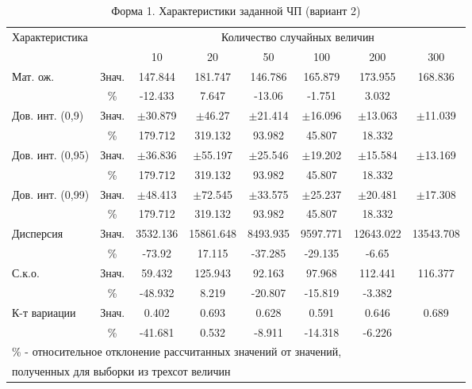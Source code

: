 \documentclass{article}
\begin{document}
\begin{table}[H]
    \centering
    \caption{Форма 1. Характеристики заданной ЧП (вариант 2)}
    \begin{tabular}{|l|c|c|c|c|c|c|c|}
    \hline
    \multirow{2}{*}{Характеристика}& & \multicolumn{6}{c|}{Количество случайных величин} \\
    \cline{3-8}
    & & 10 & 20 & 50 & 100 & 200 & 300 \\
    \hline
    Мат. ож. & Знач. & 147.844 & 181.747 & 146.786 & 165.879 & 173.955 & 168.836 \\
     & \%            & -12.433 & 7.647 & -13.06 & -1.751 & 3.032 &  \\ 
    \hline
    Дов. инт. (0,9) & Знач.& $\pm$30.879 & $\pm$46.27 & $\pm$21.414 & $\pm$16.096 & $\pm$13.063 & $\pm$11.039 \\
     & \%                  & 179.712 & 319.132 & 93.982 & 45.807 & 18.332 &  \\
    \hline
    Дов. инт. (0,95) & Знач.& $\pm$36.836 & $\pm$55.197 & $\pm$25.546 & $\pm$19.202 & $\pm$15.584 & $\pm$13.169 \\
     & \%                   & 179.712 & 319.132 & 93.982 & 45.807 & 18.332 &  \\
    \hline
    Дов. инт. (0,99) & Знач.& $\pm$48.413 & $\pm$72.545 & $\pm$33.575 & $\pm$25.237 & $\pm$20.481 & $\pm$17.308 \\
     & \%                   & 179.712 & 319.132 & 93.982 & 45.807 & 18.332 &  \\
    \hline
    Дисперсия & Знач. & 3532.136 & 15861.648 & 8493.935 & 9597.771 & 12643.022 & 13543.708\\
     & \%             & -73.92 & 17.115 & -37.285 & -29.135 & -6.65 &  \\
    \hline
    С.к.о. & Знач. & 59.432 & 125.943 & 92.163 & 97.968 & 112.441 & 116.377\\
     & \%          & -48.932 & 8.219 & -20.807 & -15.819 & -3.382 &  \\
    \hline
    К-т вариации & Знач. & 0.402 & 0.693 & 0.628 & 0.591 & 0.646 & 0.689\\
     & \%                & -41.681 & 0.532 & -8.911 & -14.318 & -6.226 &  \\
    \hline
    \multicolumn{7}{l}{\footnotesize \% - относительное отклонение рассчитанных значений от значений,}\\
    \multicolumn{7}{l}{\footnotesize полученных для выборки из трехсот величин}
    \end{tabular}
    \end{table}
\end{document}
